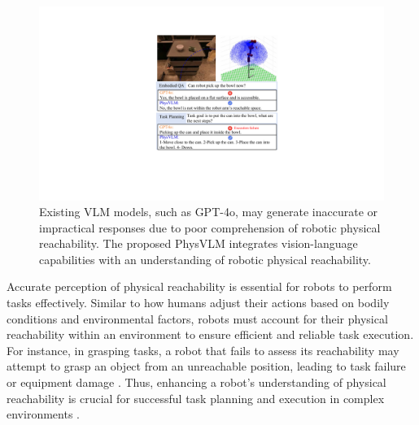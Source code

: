 \documentclass[10pt,twocolumn,letterpaper]{article}
\begin{document}
\begin{figure}[ht] %
\vskip 0.2in
\begin{center}
\centerline{\includegraphics[width=1\linewidth]{images/image1.pdf}}
\caption{Existing VLM models, such as GPT-4o, may generate inaccurate or impractical responses due to poor comprehension of robotic physical reachability. The proposed PhysVLM integrates vision-language capabilities with an understanding of robotic physical reachability.}
\label{image1}
\end{center}
\vskip -0.2in
\end{figure}

Accurate perception of physical reachability is essential for robots to perform tasks effectively. Similar to how humans adjust their actions based on bodily conditions and environmental factors, robots must account for their physical reachability within an environment to ensure efficient and reliable task execution. For instance, in grasping tasks, a robot that fails to assess its reachability may attempt to grasp an object from an unreachable position, leading to task failure or equipment damage \cite{physical1, physical2}. Thus, enhancing a robot's understanding of physical reachability is crucial for successful task planning and execution in complex environments \cite{ws1, workspace_structure}.
\end{document}
